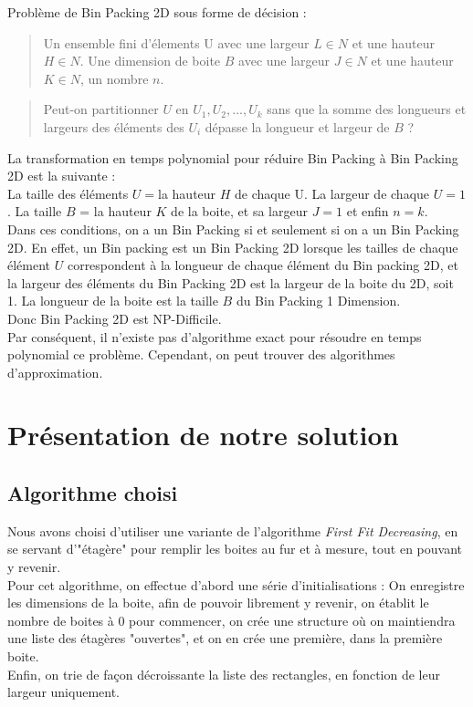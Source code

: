 \documentclass[12pt]{article}
\begin{document}
Problème de Bin Packing 2D sous forme de décision : \\
   \begin{quote}
Un ensemble fini d’élements U avec une largeur $L \in N$ et une hauteur $H \in N$. Une dimension de boite $B$ avec une largeur $J \in N$ et une hauteur $K \in N$, un nombre $n$.  \end{quote}
   \begin{quote}
 Peut-on partitionner  $U$ en $U_1, U_2, ..., U_k$ sans que la somme des longueurs et largeurs des éléments des $U_i$ dépasse la longueur et largeur de $B$ ?  \end{quote}
 
La transformation en temps polynomial pour réduire Bin Packing à Bin Packing 2D est la suivante : \\
La taille des éléments $U = $la hauteur $H$ de chaque U. La largeur de chaque $U = 1$. La taille $B$ = la hauteur $K$ de la boite, et sa largeur $J = 1$ et enfin $n=k$. \\ 
Dans ces conditions, on a un Bin Packing si et seulement si on a un Bin Packing 2D. En effet, un Bin packing est un Bin Packing 2D lorsque les tailles de chaque élément $U$ correspondent à la longueur de chaque élément du Bin packing 2D, et la largeur des éléments du Bin Packing 2D est la largeur de la boite du 2D, soit 1. La longueur de la boite est la taille $B$ du Bin Packing 1 Dimension. \\
Donc Bin Packing 2D est NP-Difficile.\\
Par conséquent, il n'existe pas d'algorithme exact pour résoudre en temps polynomial ce problème. Cependant, on peut trouver des algorithmes d'approximation. 

\newpage
\section{Présentation de notre solution}
\subsection*{Algorithme choisi}
Nous avons choisi d'utiliser une variante de l'algorithme \emph{First Fit Decreasing}, en se servant d'"étagère" pour remplir les boites au fur et à mesure, tout en pouvant y revenir. \\
Pour cet algorithme, on effectue d'abord une série d'initialisations : On enregistre les dimensions de la boite, afin de pouvoir librement y revenir, on établit le nombre de boites à 0 pour commencer, on crée une structure où on maintiendra une liste des étagères "ouvertes", et on en crée une première, dans la première boite. \\
Enfin, on trie de façon décroissante la liste des rectangles, en fonction de leur largeur uniquement. \\
\end{document}

